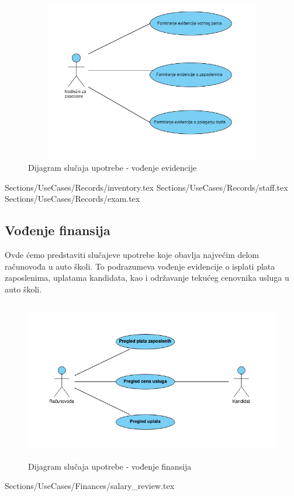 \begin{figure}[H]
    \begin{center}
        \includegraphics[width=170mm, height=70mm]{Diagrams/evidencija.png}
    \end{center}
    \caption {Dijagram slučaja upotrebe - vođenje evidencije}
    \label{usecase_praktična obuka}

\end{figure}

 {Sections/UseCases/Records/inventory.tex}
 {Sections/UseCases/Records/staff.tex}
 {Sections/UseCases/Records/exam.tex}


\subsection {Vođenje finansija}
Ovde ćemo predstaviti slučajeve upotrebe koje obavlja najvećim delom računovođa u auto školi.
To podrazumeva vođenje evidencije o isplati plata zaposlenima, uplatama kandidata, kao i održavanje tekućeg cenovnika usluga u auto školi.

\begin{figure}[H]
    \begin{center}
        \includegraphics[width=170mm, height=70mm]{Diagrams/vodjenje_finansija.png}
    \end{center}
    \caption {Dijagram slučaja upotrebe - vođenje finansija}
    \label{usecase_praktična obuka}

\end{figure}

 {Sections/UseCases/Finances/salary_review.tex}


